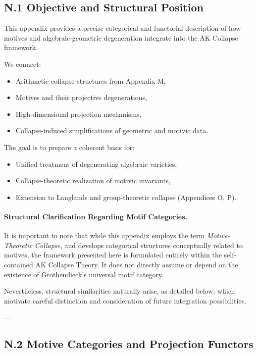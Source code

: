 \documentclass[11pt]{article}
\begin{document}
\subsection*{N.1 Objective and Structural Position}

This appendix provides a precise categorical and functorial description of how motives and algebraic-geometric degeneration integrate into the AK Collapse framework.  

We connect:
\begin{itemize}
  \item Arithmetic collapse structures from Appendix M,
  \item Motives and their projective degenerations,
  \item High-dimensional projection mechanisms,
  \item Collapse-induced simplifications of geometric and motivic data.
\end{itemize}

The goal is to prepare a coherent basis for:
\begin{itemize}
  \item Unified treatment of degenerating algebraic varieties,
  \item Collapse-theoretic realization of motivic invariants,
  \item Extension to Langlands and group-theoretic collapse (Appendices O, P).
\end{itemize}

\paragraph{Structural Clarification Regarding Motif Categories.}

It is important to note that while this appendix employs the term \textit{Motive-Theoretic Collapse}, and develops categorical structures conceptually related to motives, the framework presented here is formulated entirely within the self-contained AK Collapse Theory. It does not directly assume or depend on the existence of Grothendieck's universal motif category.

Nevertheless, structural similarities naturally arise, as detailed below, which motivate careful distinction and consideration of future integration possibilities.

---

\subsection*{N.2 Motive Categories and Projection Functors}
\end{document}
